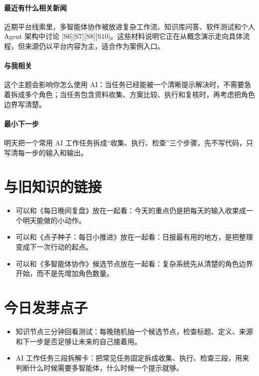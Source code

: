 \documentclass[UTF8,zihao=-4]{ctexart}
\begin{document}
\paragraph{最近有什么相关新闻} 近期平台线索里，多智能体协作被放进复杂工作流、知识库问答、软件测试和个人 Agent 架构中讨论 [S6][S7][S8][S10]。这些材料说明它正在从概念演示走向具体流程，但来源仍以平台内容为主，适合作为案例入口。
\paragraph{与我相关} 这个主题会影响你怎么使用 AI：当任务已经能被一个清晰提示解决时，不需要急着拆成多个角色；当任务包含资料收集、方案比较、执行和复核时，再考虑把角色边界写清楚。
\paragraph{最小下一步} 明天把一个常用 AI 工作任务拆成“收集、执行、检查”三个步骤，先不写代码，只写清每一步的输入和输出。
\section*{与旧知识的链接}
\begin{itemize}[leftmargin=2em]
\item 可以和《每日晚间复盘》放在一起看：今天的重点仍是把每天的输入收束成一个明天能做的小动作。
\item 可以和《点子种子：每日小推进》放在一起看：日报最有用的地方，是把整理变成下一次行动的起点。
\item 可以和《多智能体协作》候选节点放在一起看：复杂系统先从清楚的角色边界开始，而不是先增加角色数量。
\end{itemize}
\section*{今日发芽点子}
\begin{itemize}[leftmargin=2em]
\item 知识节点三分钟回看测试：每晚随机抽一个候选节点，检查标题、定义、来源和下一步是否足够让未来的自己接着用。
\item AI 工作任务三段拆解卡：把常见任务固定拆成收集、执行、检查三段，用来判断什么时候需要多智能体，什么时候一个提示就够。
\end{itemize}
\end{document}
